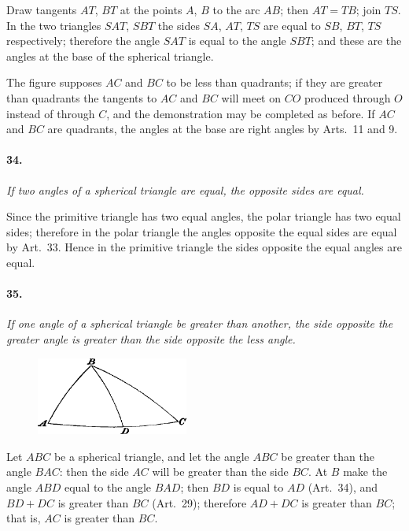 \documentclass{book}[2004/02/16]
\begin{document}
\begin{mainmatter}
\begin{spacing}{1.3}
Draw tangents $AT$, $BT$ at the points $A$, $B$ to the arc $AB$; then
$AT=TB$; join $TS$. In the two triangles $SAT$, $SBT$ the sides
$SA$, $AT$, $TS$ are equal to $SB$, $BT$, $TS$ respectively; therefore the
angle $SAT$ is equal to the angle $SBT$; and these are the angles at
the base of the spherical triangle.

The figure supposes $AC$ and $BC$ to be less than quadrants; if
they are greater than quadrants the tangents to $AC$ and $BC$ will
meet on $CO$ produced through $O$ instead of through $C$, and the
demonstration may be completed as before. If $AC$ and $BC$ are
quadrants, the angles at the base are right angles by Arts.~11
and 9.

\paragraph{34.} \textit{If two angles of a spherical triangle are equal, the opposite
sides are equal.}

Since the primitive triangle has two equal angles, the polar
triangle has two equal sides; therefore in the polar triangle the
angles opposite the equal sides are equal by Art.~33. Hence in
the primitive triangle the sides opposite the equal angles are
equal.

\paragraph{35.} \textit{If one angle of a spherical triangle be greater than another,
the side opposite the greater angle is greater than the side
opposite the less angle.}
\begin{figure}[htp]
\centering
\includegraphics[width=5.0cm]{images/025fc}
\end{figure}

Let $ABC$ be a spherical triangle, and let the angle $ABC$ be
greater than the angle $BAC$: then the side $AC$ will be greater
than the side $BC$. At $B$ make the angle $ABD$ equal to the angle
$BAD$; then $BD$ is equal to $AD$ (Art.\ 34), and $BD+DC$ is greater
than $BC$ (Art.\ 29); therefore $AD+DC$ is greater than $BC$; that
is, $AC$ is greater than $BC$.


\end{spacing}
\end{mainmatter}
\end{document}
